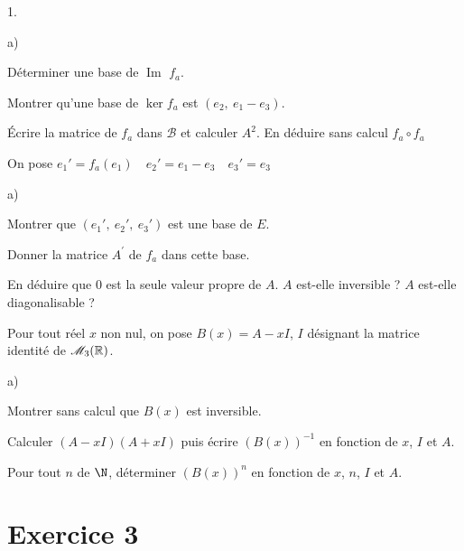 \documentclass[11pt]{article}%
\begin{document}
\begin{noliste}{1.}
 \setlength{\itemsep}{4mm}
\item 

\begin{noliste}{a)}
 \setlength{\itemsep}{2mm}
\item Déterminer une base de $\operatorname{Im}$ $f_{a}$.

\item Montrer qu'une base de $\ker f_{a}$ est $(e_{2},\ e_{1}-e_{3})$.
\end{noliste}

\item Écrire la matrice de $f_{a}$ dans $\mathcal{B}$ et calculer
$A^{2}$.
En déduire sans calcul $f_{a}\circ f_{a}$

\item On pose $e_{1}{\prime } = f_{a}(e_{1})\quad e_{2}{\prime
} = e_{1}-e_{3}\quad e_{3}{\prime } = e_{3}$

\begin{noliste}{a)}
 \setlength{\itemsep}{2mm}
\item Montrer que $(e_{1}{\prime },\ e_{2}{\prime },\ e_{3}{\prime })$
est une base de $E$.

\item Donner la matrice $A^{\prime }$ de $f_{a}$ dans cette base.

\item En déduire que $0$ est la seule valeur propre de $A$. $A$
est-elle
inversible ? $A$ est-elle diagonalisable ?
\end{noliste}

\item Pour tout réel $x$ non nul, on pose $B(x) = A-xI$, $I$ désignant
la
matrice identité de $\mathscr{M}_{3}(\mathbb{R})$.

\begin{noliste}{a)}
 \setlength{\itemsep}{2mm}
\item Montrer sans calcul que $B(x)$ est inversible.

\item Calculer $(A-xI)(A + xI)$ puis écrire $(B(x))^{-1}$ en fonction
de $x$, $I$ et $A$.

\item Pour tout $n$ de $\N$, déterminer $(B(x))^{n}$ en fonction de
$x$, $n$, $I$ et $A$.
\end{noliste}
\end{noliste}

\section*{Exercice 3}
\end{document}
